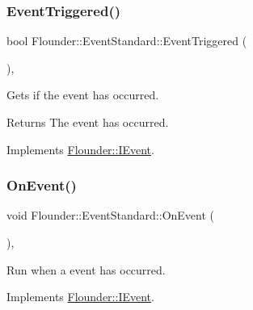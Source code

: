 \subsubsection{\texorpdfstring{Event\+Triggered()}{EventTriggered()}}
{\footnotesize\ttfamily bool Flounder\+::\+Event\+Standard\+::\+Event\+Triggered (\begin{DoxyParamCaption}{ }\end{DoxyParamCaption})\hspace{0.3cm}{\ttfamily [override]}, {\ttfamily [virtual]}}



Gets if the event has occurred. 

\begin{DoxyReturn}{Returns}
The event has occurred. 
\end{DoxyReturn}


Implements \hyperlink{class_flounder_1_1_i_event_a86004d7cbef85aa2f80e6def5dc107b3}{Flounder\+::\+I\+Event}.

\mbox{\label{class_flounder_1_1_event_standard_a3981a5be6ab41ce624b9752d5f7bdf36}} 
\subsubsection{\texorpdfstring{On\+Event()}{OnEvent()}}
{\footnotesize\ttfamily void Flounder\+::\+Event\+Standard\+::\+On\+Event (\begin{DoxyParamCaption}{ }\end{DoxyParamCaption})\hspace{0.3cm}{\ttfamily [override]}, {\ttfamily [virtual]}}



Run when a event has occurred. 



Implements \hyperlink{class_flounder_1_1_i_event_a67f7265c6decfdf4d29b94a088f45501}{Flounder\+::\+I\+Event}.

\mbox{\label{class_flounder_1_1_event_standard_aa566585df82dfec06f60279112175321}} 
